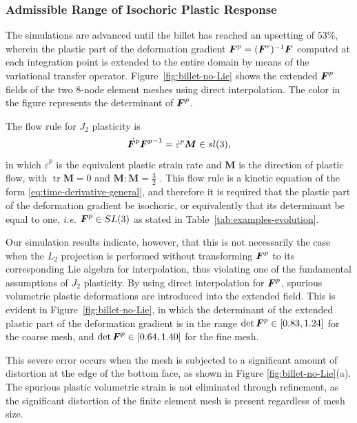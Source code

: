 \documentclass[12pt]{article}
\newcommand{\mbs}[1]{\boldsymbol{#1}}
\def\bM{{\mbs{M}}} \def\bN{{\mbs{N}}} \def\bO{{\mbs{O}}}
\DeclareMathOperator{\tr}{tr}
\begin{document}
\subsubsection{Admissible Range of Isochoric Plastic Response}

The simulations are advanced until the billet has reached an upsetting of
$53\%$, wherein the plastic part of the deformation gradient $\bF^{p} =
(\bF^{e})^{-1} \bF$ computed at each integration point is extended to the entire
domain by means of the variational transfer operator.
Figure~\ref{fig:billet-no-Lie} shows the extended $\bF^{p}$ fields of the two
$8$-node element meshes using direct interpolation. The color in the figure
represents the determinant of $\bF^{p}$.

The flow rule for $J_2$ plasticity is
\begin{equation}
  \dot{\bF^p} {\bF^p}^{-1} = \dot{\varepsilon}^p \bM \in sl(3),
  \label{J2-flow-rule}
\end{equation}
in which $\dot{\varepsilon}^p$ is the equivalent plastic strain rate
and $\bM$ is the direction of plastic flow, with $\tr \bM = 0$ and
$\bM:\bM = \frac{3}{2}$ \citep{Ortiz.Stainier:1999}. This flow rule is
a kinetic equation of the form \eqref{eq:time-derivative-general}, and
therefore it is required that the plastic part of the deformation
gradient be isochoric, or equivalently that its determinant be equal
to one, \emph{i.e.} $\bF^p \in SL(3)$ as stated in
Table~\ref{tab:examples-evolution}.

Our simulation results indicate, however, that this is not necessarily the case
when the $L_2$ projection is performed without transforming $\bF^{p}$ to its
corresponding Lie algebra for interpolation, thus violating one of the
fundamental assumptions of $J_2$ plasticity. By using direct interpolation for
$\bF^p$, spurious volumetric plastic deformations are introduced into the
extended field. This is evident in Figure~\ref{fig:billet-no-Lie}, in which the
determinant of the extended plastic part of the deformation gradient is in the
range $\det \bF^p \in [0.83, 1.24]$ for the coarse mesh, and $\det \bF^p \in
[0.64, 1.40]$ for the fine mesh.

This severe error occurs when the mesh is subjected to a significant amount of
distortion at the edge of the bottom face, as shown in Figure
\ref{fig:billet-no-Lie}(a). The spurious plastic volumetric strain is not
eliminated through refinement, as the significant distortion of the finite
element mesh is present regardless of mesh size.
\end{document}
